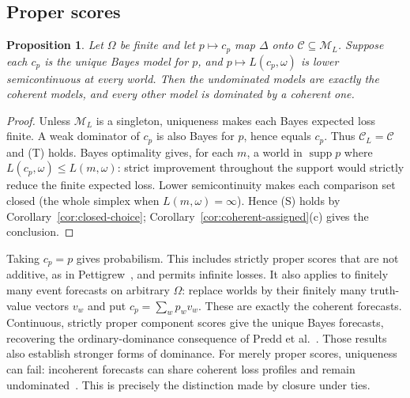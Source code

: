 \documentclass[11pt]{article}
\newtheorem{proposition}[theorem]{Proposition}
\theoremstyle{definition}
\theoremstyle{remark}
\newcommand{\M}{\mathcal M}
\newcommand{\C}{\mathcal C}
\newcommand{\supp}{\operatorname{supp}}
\begin{document}
\subsection{Proper scores}
\begin{proposition}\label{prop:short-proper}
Let $\Omega$ be finite and let $p\mapsto c_p$ map $\Delta$ onto $\C\subseteq\M_L$. Suppose each $c_p$ is the unique Bayes model for $p$, and $p\mapsto L(c_p,\omega)$ is lower semicontinuous at every world. Then the undominated models are exactly the coherent models, and every other model is dominated by a coherent one.
\end{proposition}
\begin{proof}
Unless $\M_L$ is a singleton, uniqueness makes each Bayes expected loss finite. A weak dominator of $c_p$ is also Bayes for $p$, hence equals $c_p$. Thus $\C_L=\C$ and (T) holds. Bayes optimality gives, for each $m$, a world in $\supp p$ where $L(c_p,\omega)\le L(m,\omega)$: strict improvement throughout the support would strictly reduce the finite expected loss. Lower semicontinuity makes each comparison set closed (the whole simplex when $L(m,\omega)=\infty$). Hence (S) holds by Corollary~\ref{cor:closed-choice}; Corollary~\ref{cor:coherent-assigned}(c) gives the conclusion.
\end{proof}
Taking $c_p=p$ gives probabilism. This includes strictly proper scores that are not additive, as in Pettigrew~\cite{Pettigrew2022}, and permits infinite losses. It also applies to finitely many event forecasts on arbitrary $\Omega$: replace worlds by their finitely many truth-value vectors $v_w$ and put $c_p=\sum_wp_wv_w$. These are exactly the coherent forecasts. Continuous, strictly proper component scores give the unique Bayes forecasts, recovering the ordinary-dominance consequence of Predd et al.~\cite{Predd2009}. Those results also establish stronger forms of dominance. For merely proper scores, uniqueness can fail: incoherent forecasts can share coherent loss profiles and remain undominated~\cite{SSK2009}. This is precisely the distinction made by closure under ties.
\end{document}
